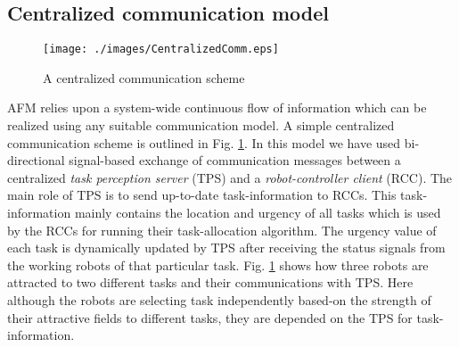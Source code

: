 \documentclass[journal]{IEEEtran}
\begin{document}
\subsection{Centralized communication model}
\begin{figure}
\centering
\texttt{[image: ./images/CentralizedComm.eps]}
\caption{\small A centralized communication scheme} %
\label{fig:ccm} %
\end{figure}
AFM relies upon a system-wide continuous flow of information which can be realized using any suitable communication model. A simple centralized communication scheme is outlined in Fig. \ref{fig:ccm}. In this model we have used bi-directional signal-based exchange of communication messages between a centralized \textit{task perception server} (TPS) and a \textit{robot-controller client} (RCC). The main role of TPS is to send up-to-date task-information to RCCs. This  task-information mainly contains the location and urgency of all tasks  which is used by the RCCs for running their task-allocation algorithm. The urgency value of each task is dynamically updated  by TPS after receiving the  status signals from the working robots of that particular task. Fig. \ref{fig:ccm} shows how three robots are attracted to two different tasks and their communications with TPS. Here although the robots are selecting task independently based-on the strength of their attractive fields to different tasks, they are depended on the TPS for task-information.
%
\end{document}
